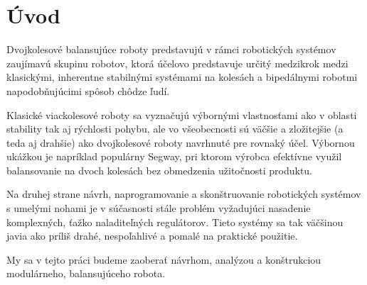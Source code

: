 %
% 
%
%

\chapter{Úvod}

Dvojkolesové balansujúce roboty predstavujú v rámci robotických systémov zaujímavú skupinu robotov, ktorá účelovo predstavuje určitý medzikrok medzi klasickými, inherentne stabilnými systémami na kolesách a bipedálnymi robotmi napodobňujúcimi spôsob chôdze ľudí.
 
Klasické viackolesové roboty sa vyznačujú výbornými vlastnosťami ako v oblasti stability tak aj rýchlosti pohybu, ale vo všeobecnosti sú väčšie a zložitejšie (a teda aj drahšie) ako dvojkolesové roboty navrhnuté pre rovnaký účel. Výbornou ukážkou je napríklad populárny Segway, pri ktorom výrobca efektívne využil balansovanie na dvoch kolesách bez obmedzenia užitočnosti produktu.   

Na druhej strane návrh, naprogramovanie a skonštruovanie robotických systémov s umelými nohami je v súčasnosti stále problém vyžadujúci nasadenie komplexných, ťažko naladiteľných regulátorov. Tieto systémy sa tak väčšinou javia ako príliš drahé, nespoľahlivé a pomalé na praktické použitie. 

My sa v tejto práci budeme zaoberať návrhom, analýzou a konštrukciou modulárneho, balansujúceho robota.  
